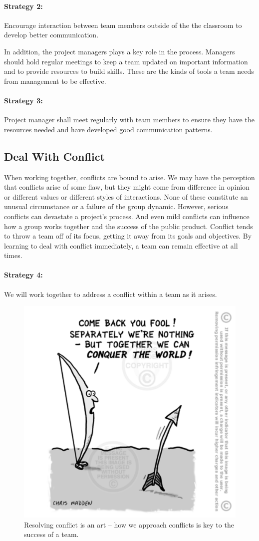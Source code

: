 \documentclass{article}\usepackage[]{graphicx}\usepackage[]{color}
\begin{document}
\paragraph{Strategy 2:} Encourage interaction between team members outside of the the classroom to develop better communication. 

In addition, the project managers plays a key role in the process. Managers should hold regular meetings to keep a team updated on important information and to provide resources to build skills. These are the kinds of tools a team needs from management to be effective. 

\paragraph{Strategy 3:} Project manager shall meet regularly with team members to ensure they have the resources needed and have developed good communication patterns.

\subsection{Deal With Conflict}

When working together, conflicts are bound to arise. We may have the perception that conflicts arise of some flaw, but they might come from difference in opinion or different values or different styles of interactions. None of these constitute an unusual circumstance or a failure of the group dynamic. However, serious conflicts can devastate a project's process. And even mild conflicts can influence how a group works together and the success of the public product. Conflict tends to throw a team off of its focus, getting it away from its goals and objectives. By learning to deal with conflict immediately, a team can remain effective at all times.

\paragraph{Strategy 4:} We will work together to address a conflict within a team as it arises. 

\begin{figure}
\includegraphics[width=.50\textwidth]{../../Graphics/Bow-arrow-conquer-world}
\caption{Resolving conflict is an art -- how we approach conflicts is key to the success of a team.}
\end{figure}
\end{document}
